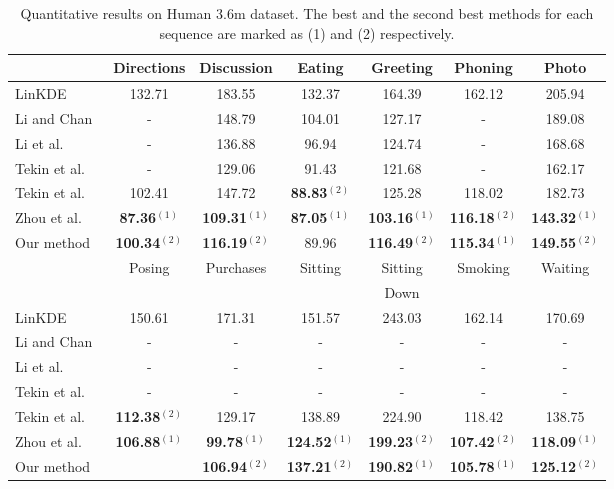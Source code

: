 \documentclass[runningheads]{llncs}
\begin{document}
\begin{table}[t]
\centering
\caption{Quantitative results on Human 3.6m dataset. The best and the second best methods for each sequence are marked as (1) and (2) respectively.}
\label{tab1}
\begin{tabular}{ l c c c c c c }
  \hline
  \quad & Directions & Discussion & Eating & Greeting & Phoning & Photo \\ \hline
  LinKDE~\cite{h36m_pami}\quad & 132.71 & 183.55 & 132.37 & 164.39 & 162.12 & 205.94 \\
  Li and Chan~\cite{li20143d}\quad & - & 148.79 & 104.01 & 127.17 & - & 189.08 \\
  Li et al.~\cite{li2015maximum}\quad & - & 136.88 & 96.94 & 124.74 & - & 168.68 \\
  Tekin et al.~\cite{tekin2016structured}\quad & - & 129.06 & 91.43 & 121.68 & - & 162.17 \\
  Tekin et al.~\cite{Tekin_2016_CVPR}\quad & 102.41 & 147.72 & \bf 88.83$^{(2)}$ & 125.28 & 118.02 & 182.73 \\
  Zhou et al.~\cite{Zhou_2016_CVPR}\quad & \bf 87.36$^{(1)}$ & \bf 109.31$^{(1)}$ & \bf 87.05$^{(1)}$ & \bf 103.16$^{(1)}$ & \bf 116.18$^{(2)}$ & \bf 143.32$^{(1)}$ \\
  Our method\quad & \bf 100.34$^{(2)}$ & \bf 116.19$^{(2)}$ & 89.96 & \bf 116.49$^{(2)}$ & \bf 115.34$^{(1)}$ & \bf 149.55$^{(2)}$ \\ \hline

  \multirow{2}{*}{\quad} & \multirow{2}{*}{Posing} & \multirow{2}{*}{Purchases} & \multirow{2}{*}{Sitting} & Sitting & \multirow{2}{*}{Smoking} & \multirow{2}{*}{Waiting} \\
  & & & & Down & & \\ \hline
  LinKDE~\cite{h36m_pami}\quad & 150.61 & 171.31 & 151.57 & 243.03 & 162.14 & 170.69 \\
  Li and Chan~\cite{li20143d}\quad & - & - & - & - & - & - \\
  Li et al.~\cite{li2015maximum}\quad & - & - & - & - & - & - \\
  Tekin et al.~\cite{tekin2016structured}\quad & - & - & - & - & - & - \\
  Tekin et al.~\cite{Tekin_2016_CVPR}\quad & \bf 112.38$^{(2)}$ & 129.17 & 138.89 & 224.90 & 118.42 & 138.75 \\
  Zhou et al.~\cite{Zhou_2016_CVPR}\quad & \bf 106.88$^{(1)}$ & \bf 99.78$^{(1)}$ & \bf 124.52$^{(1)}$ & \bf 199.23$^{(2)}$ & \bf 107.42$^{(2)}$ & \bf 118.09$^{(1)}$ \\
  Our method\quad & \quad117.57 & \bf 106.94$^{(2)}$ & \bf 137.21$^{(2)}$ & \bf 190.82$^{(1)}$ & \bf 105.78$^{(1)}$ & \bf 125.12$^{(2)}$ \\ \hline


\end{tabular}
\end{table}
\end{document}
